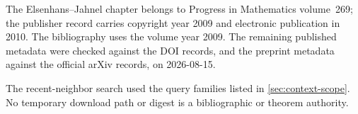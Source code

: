The Elsenhans--Jahnel chapter belongs to Progress in Mathematics
volume~269; the publisher record carries copyright year 2009 and electronic
publication in 2010.  The bibliography uses the volume year 2009.  The
remaining published metadata were checked against the DOI records, and the
preprint metadata against the official arXiv records, on 2026-08-15.

The recent-neighbor search used the query families listed in
\cref{sec:context-scope}.  No temporary download path or digest is a
bibliographic or theorem authority.
